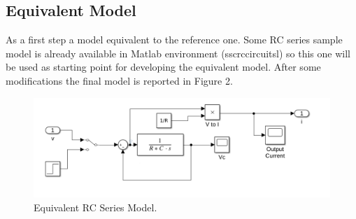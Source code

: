 \subsection{Equivalent Model}
As a first step a model equivalent to the reference one. Some RC series sample model is already available in Matlab environment (ssc\textunderscore rc\textunderscore circuit\textunderscore sl) so this one will be used as starting point for developing the equivalent model. After some modifications the final model is reported in Figure 2.
\newline
\begin{figure}[h]
\centering
\includegraphics[width=1.0\textwidth]{SimulinkModel.png}
\caption{\label{fig:EquivalentModel}Equivalent RC Series Model.}
\end{figure}

